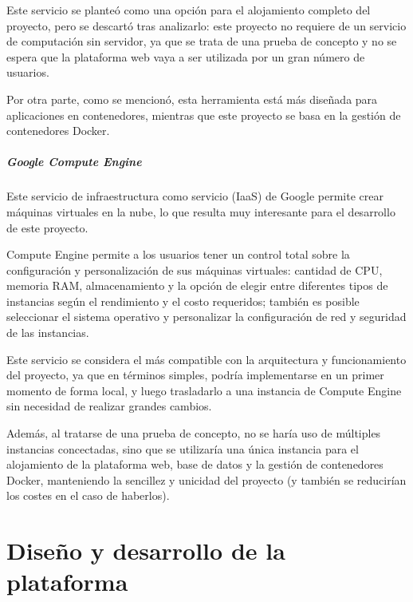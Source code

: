                     Este servicio se planteó como una opción para el alojamiento completo del proyecto, pero se descartó tras analizarlo: este proyecto no requiere de un servicio de computación sin servidor, ya que se trata de una prueba de concepto y no se espera que la plataforma web vaya a ser utilizada por un gran número de usuarios.

                    Por otra parte, como se mencionó, esta herramienta está más diseñada para aplicaciones en contenedores, mientras que este proyecto se basa en la gestión de contenedores Docker.

                \paragraph{Google Compute Engine}

                    Este servicio de infraestructura como servicio (IaaS) de Google permite crear máquinas virtuales en la nube, lo que resulta muy interesante para el desarrollo de este proyecto.

                    Compute Engine permite a los usuarios tener un control total sobre la configuración y personalización de sus máquinas virtuales: cantidad de CPU, memoria RAM, almacenamiento y la opción de elegir entre diferentes tipos de instancias según el rendimiento y el costo requeridos; también es posible seleccionar el sistema operativo y personalizar la configuración de red y seguridad de las instancias.

                    Este servicio se considera el más compatible con la arquitectura y funcionamiento del proyecto, ya que en términos simples, podría implementarse en un primer momento de forma local, y luego trasladarlo a una instancia de Compute Engine sin necesidad de realizar grandes cambios.

                    Además, al tratarse de una prueba de concepto, no se haría uso de múltiples instancias concectadas, sino que se utilizaría una única instancia para el alojamiento de la plataforma web, base de datos y la gestión de contenedores Docker, manteniendo la sencillez y unicidad del proyecto (y también se reducirían los costes en el caso de haberlos).

                    \cleardoublepage



\chapter{Diseño y desarrollo de la plataforma}
    
